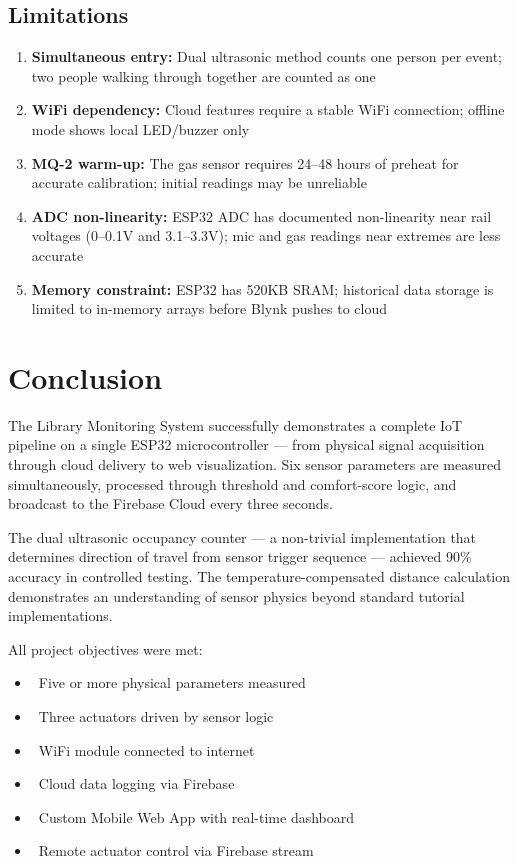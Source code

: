 \documentclass[12pt,a4paper]{article}
\begin{document}
\subsection{Limitations}

\begin{enumerate}[leftmargin=1.5cm]
  \item \textbf{Simultaneous entry:} Dual ultrasonic method counts one person per event; two people walking through together are counted as one
  \item \textbf{WiFi dependency:} Cloud features require a stable WiFi connection; offline mode shows local LED/buzzer only
  \item \textbf{MQ-2 warm-up:} The gas sensor requires 24–48 hours of preheat for accurate calibration; initial readings may be unreliable
  \item \textbf{ADC non-linearity:} ESP32 ADC has documented non-linearity near rail voltages (0--0.1V and 3.1--3.3V); mic and gas readings near extremes are less accurate
  \item \textbf{Memory constraint:} ESP32 has 520KB SRAM; historical data storage is limited to in-memory arrays before Blynk pushes to cloud
\end{enumerate}

\newpage

\section{Conclusion}

The Library Monitoring System successfully demonstrates a complete IoT pipeline on a single ESP32 microcontroller — from physical signal acquisition through cloud delivery to web visualization. Six sensor parameters are measured simultaneously, processed through threshold and comfort-score logic, and broadcast to the Firebase Cloud every three seconds.

The dual ultrasonic occupancy counter — a non-trivial implementation that determines direction of travel from sensor trigger sequence — achieved 90\% accuracy in controlled testing. The temperature-compensated distance calculation demonstrates an understanding of sensor physics beyond standard tutorial implementations.

All project objectives were met:
\begin{itemize}[leftmargin=1.5cm]
  \item \checkmark \ Five or more physical parameters measured
  \item \checkmark \ Three actuators driven by sensor logic
  \item \checkmark \ WiFi module connected to internet
  \item \checkmark \ Cloud data logging via Firebase
  \item \checkmark \ Custom Mobile Web App with real-time dashboard
  \item \checkmark \ Remote actuator control via Firebase stream
\end{itemize}
\end{document}
